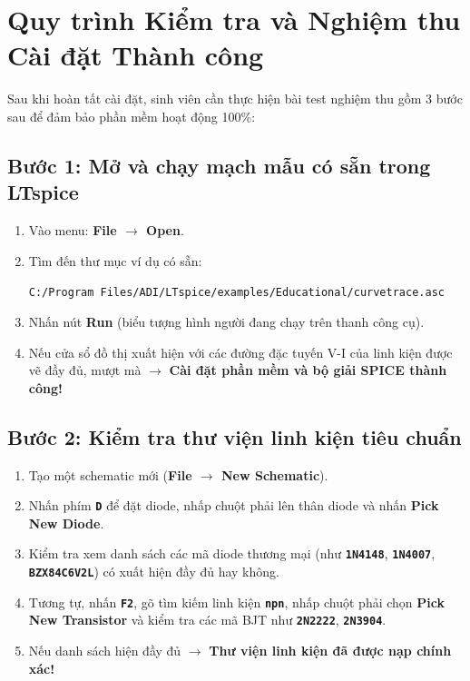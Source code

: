 \documentclass[11pt,a4paper]{article}
\newcommand{\code}[1]{\texttt{\color{navy}\textbf{#1}}}
\newcommand{\pathdir}[1]{\texttt{\color{darkblue}#1}}
\newcommand{\key}[1]{\colorbox{gray!20}{\texttt{\textbf{#1}}}}
\begin{document}
\section{Quy trình Kiểm tra và Nghiệm thu Cài đặt Thành công}

Sau khi hoàn tất cài đặt, sinh viên cần thực hiện bài test nghiệm thu gồm 3 bước sau để đảm bảo phần mềm hoạt động 100\%:

\subsection{Bước 1: Mở và chạy mạch mẫu có sẵn trong LTspice}
\begin{enumerate}[itemsep=2pt]
  \item Vào menu: \textbf{File $\rightarrow$ Open}.
  \item Tìm đến thư mục ví dụ có sẵn:
  \begin{center}
    \pathdir{C:/Program Files/ADI/LTspice/examples/Educational/curvetrace.asc}
  \end{center}
  \item Nhấn nút \textbf{Run} (biểu tượng hình người đang chạy trên thanh công cụ).
  \item Nếu cửa sổ đồ thị xuất hiện với các đường đặc tuyến V-I của linh kiện được vẽ đầy đủ, mượt mà $\rightarrow$ \textbf{Cài đặt phần mềm và bộ giải SPICE thành công!}
\end{enumerate}

\subsection{Bước 2: Kiểm tra thư viện linh kiện tiêu chuẩn}
\begin{enumerate}[itemsep=2pt]
  \item Tạo một schematic mới (\textbf{File $\rightarrow$ New Schematic}).
  \item Nhấn phím \key{D} để đặt diode, nhấp chuột phải lên thân diode và nhấn \textbf{Pick New Diode}.
  \item Kiểm tra xem danh sách các mã diode thương mại (như \code{1N4148}, \code{1N4007}, \code{BZX84C6V2L}) có xuất hiện đầy đủ hay không.
  \item Tương tự, nhấn \key{F2}, gõ tìm kiếm linh kiện \code{npn}, nhấp chuột phải chọn \textbf{Pick New Transistor} và kiểm tra các mã BJT như \code{2N2222}, \code{2N3904}.
  \item Nếu danh sách hiện đầy đủ $\rightarrow$ \textbf{Thư viện linh kiện đã được nạp chính xác!}
\end{enumerate}
\end{document}
